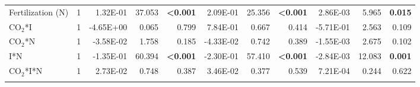 \begin{landscape}
\begin{table}
{\begin{tabular}{p{3cm}p{0.5cm}p{1.75cm}p{1.5cm}p{1.5cm}p{1.75cm}p{1.5cm}p{1.5cm}p{1.75cm}p{1.5cm}p{1.5cm}}
            Fertilization (N) & \multicolumn{1}{r}{1}
            & \multicolumn{1}{r}{1.32E-01}      & \multicolumn{1}{r}{37.053}        & \multicolumn{1}{r}{\textbf{<0.001}}
            & \multicolumn{1}{r}{2.09E-01}      & \multicolumn{1}{r}{25.356}        & \multicolumn{1}{r}{\textbf{<0.001}}
            & \multicolumn{1}{r}{2.86E-03}      & \multicolumn{1}{r}{5.965}         & \multicolumn{1}{r}{\textbf{ 0.015}} 
            \\

            CO$_2$*I & \multicolumn{1}{r}{1}
            & \multicolumn{1}{r}{-4.65E+00}     & \multicolumn{1}{r}{0.065}         & \multicolumn{1}{r}{0.799}
            & \multicolumn{1}{r}{ 7.84E-01}     & \multicolumn{1}{r}{0.667}         & \multicolumn{1}{r}{0.414}
            & \multicolumn{1}{r}{-5.71E-01}     & \multicolumn{1}{r}{2.563}         & \multicolumn{1}{r}{0.109} 
            \\

            CO$_2$*N & \multicolumn{1}{r}{1}
            & \multicolumn{1}{r}{-3.58E-02}     & \multicolumn{1}{r}{1.758}         & \multicolumn{1}{r}{0.185}
            & \multicolumn{1}{r}{-4.33E-02}     & \multicolumn{1}{r}{0.742}         & \multicolumn{1}{r}{0.389}
            & \multicolumn{1}{r}{-1.55E-03}     & \multicolumn{1}{r}{2.675}         & \multicolumn{1}{r}{0.102} 
            \\

            I*N & \multicolumn{1}{r}{1}
            & \multicolumn{1}{r}{-1.35E-01}     & \multicolumn{1}{r}{60.394}        & \multicolumn{1}{r}{\textbf{<0.001}}
            & \multicolumn{1}{r}{-2.30E-01}     & \multicolumn{1}{r}{57.410}        & \multicolumn{1}{r}{\textbf{<0.001}}
            & \multicolumn{1}{r}{-2.84E-03}     & \multicolumn{1}{r}{12.083}        & \multicolumn{1}{r}{\textbf{0.001}} 
            \\

            CO$_2$*I*N & \multicolumn{1}{r}{1}
            & \multicolumn{1}{r}{2.73E-02}      & \multicolumn{1}{r}{0.748}         & \multicolumn{1}{r}{0.387}
            & \multicolumn{1}{r}{3.46E-02}      & \multicolumn{1}{r}{0.377}         & \multicolumn{1}{r}{0.539}
            & \multicolumn{1}{r}{7.21E-04}      & \multicolumn{1}{r}{0.244}         & \multicolumn{1}{r}{0.622} 
            \\

            \hline

            &&&&&&&&&&
            \\


\end{tabular}}
\end{table}
\end{landscape}
